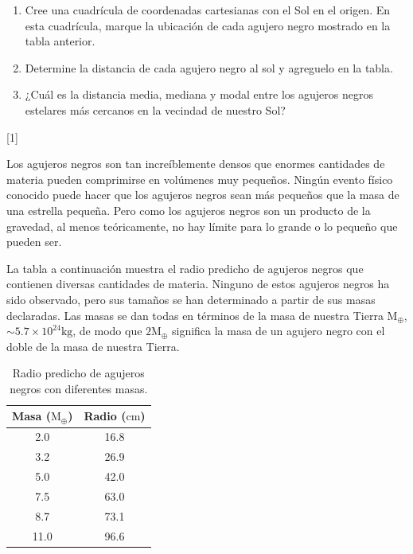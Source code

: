 \documentclass[a4paper]{article}
\newcommand{\cm}{\text{cm}}
\newcommand{\kg}{\text{kg}}
\newcommand{\Mterrestre}{\text{M}_\oplus}
\newcounter{problema}
\begin{document}
\begin{problema}
\begin{enumerate}
	\item Cree una cuadrícula de coordenadas cartesianas con el Sol en el origen.
	 En esta cuadrícula, marque la ubicación de cada agujero negro mostrado en la tabla anterior.
	 \item Determine la distancia de cada agujero negro al sol y agreguelo en la tabla.
	 \item ¿Cuál es la distancia media, mediana y modal entre los agujeros negros estelares más cercanos en la vecindad de nuestro Sol?
\end{enumerate}

\end{problema}
[1] \cite{NASA_BlackHoleMath}


\begin{problema}
Los agujeros negros son tan increíblemente densos que enormes cantidades de materia pueden comprimirse en volúmenes muy pequeños. 
Ningún evento físico conocido puede hacer que los agujeros negros sean más pequeños que la masa de una estrella pequeña. 
Pero como los agujeros negros son un producto de la gravedad, al menos teóricamente, no hay límite para lo grande o lo pequeño que pueden ser.

La tabla a continuación muestra el radio predicho de agujeros negros que contienen diversas cantidades de materia. 
Ninguno de estos agujeros negros ha sido observado, pero sus tamaños se han determinado a partir de sus masas declaradas. 
Las masas se dan todas en términos de la masa de nuestra Tierra $\Mterrestre$, $\sim 5.7 \times 10^{24}\kg$, 
de modo que  $2 \Mterrestre$ significa la masa de un agujero negro con el doble de la masa de nuestra Tierra.

\begin{table}[H]
\centering
\begin{tabular}{|c|c|}
\hline
\textbf{Masa ($\Mterrestre$)} & \textbf{Radio ($\cm$)} \\
\hline
2.0 & 16.8  \\
\hline
3.2 & 26.9  \\
\hline
5.0 & 42.0  \\
\hline
7.5 & 63.0  \\
\hline
8.7 & 73.1  \\
\hline
11.0 & 96.6  \\
\hline
\end{tabular}
\caption{Radio predicho de agujeros negros con diferentes masas.}
\label{tab:2}
\end{table}


\end{problema}
\end{document}
